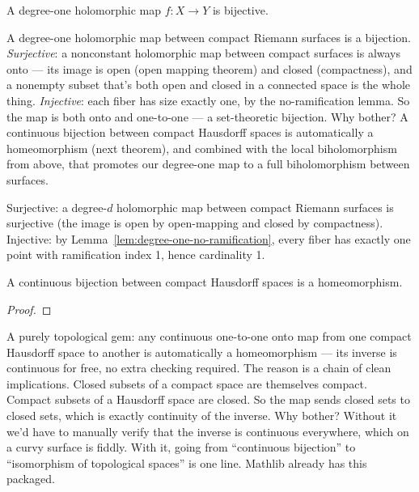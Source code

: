 \begin{theorem}
\label{thm:degree-one-bijective}
A degree-one holomorphic map \(f:X\to Y\) is bijective.
\leanok
\end{theorem}

\begin{layman}
A degree-one holomorphic map between compact Riemann surfaces is a
bijection. \emph{Surjective}: a nonconstant holomorphic map between
compact surfaces is always onto — its image is open (open mapping
theorem) and closed (compactness), and a nonempty subset that's both
open and closed in a connected space is the whole thing. \emph{Injective}:
each fiber has size exactly one, by the no-ramification lemma. So the
map is both onto and one-to-one — a set-theoretic bijection. Why bother?
A continuous bijection between compact Hausdorff spaces is automatically
a homeomorphism (next theorem), and combined with the local
biholomorphism from above, that promotes our degree-one map to a full
biholomorphism between surfaces.
\end{layman}

\begin{proofsketch}
Surjective: a degree-\(d\) holomorphic map between compact Riemann
surfaces is surjective (the image is open by open-mapping and closed by
compactness). Injective: by
Lemma~\ref{lem:degree-one-no-ramification}, every fiber has exactly one
point with ramification index 1, hence cardinality 1.
\end{proofsketch}

\begin{theorem}
\label{thm:compact-bijection-homeo}
A continuous bijection between compact Hausdorff spaces is a
homeomorphism.
\leanok\mathlibok
\end{theorem}
\begin{proof}\leanok\end{proof}

\begin{layman}
A purely topological gem: any continuous one-to-one onto map from one
compact Hausdorff space to another is automatically a homeomorphism —
its inverse is continuous for free, no extra checking required. The
reason is a chain of clean implications. Closed subsets of a compact
space are themselves compact. Compact subsets of a Hausdorff space are
closed. So the map sends closed sets to closed sets, which is exactly
continuity of the inverse. Why bother? Without it we'd have to manually
verify that the inverse is continuous everywhere, which on a curvy
surface is fiddly. With it, going from ``continuous bijection'' to
``isomorphism of topological spaces'' is one line. Mathlib already has
this packaged.
\end{layman}

